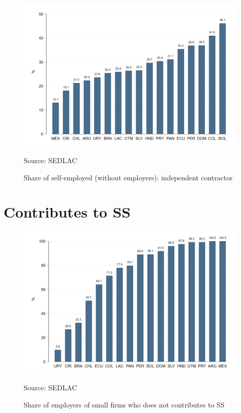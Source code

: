 \documentclass[english]{article}
\begin{document}
\begin{figure}[H]
            \justifying
                \caption{Share of self-employed (without employers): independent contractor}  
            \centerline{\includegraphics[scale=.3]{latex/figures/Self-employed/independent.png}}
                \label{fig:owner-}
                \footnotesize{Source: SEDLAC}
\end{figure}


\section{Contributes to SS}

\begin{figure}[H]
            \justifying
                \caption{Share of employers of small firms who does not contributes to SS}  
            \centerline{\includegraphics[scale=.3]{latex/figures/Self-employed/i_empgrowthfirm.png}}
                \label{fig:owner-}
                \footnotesize{Source: SEDLAC}
\end{figure}
\end{document}
